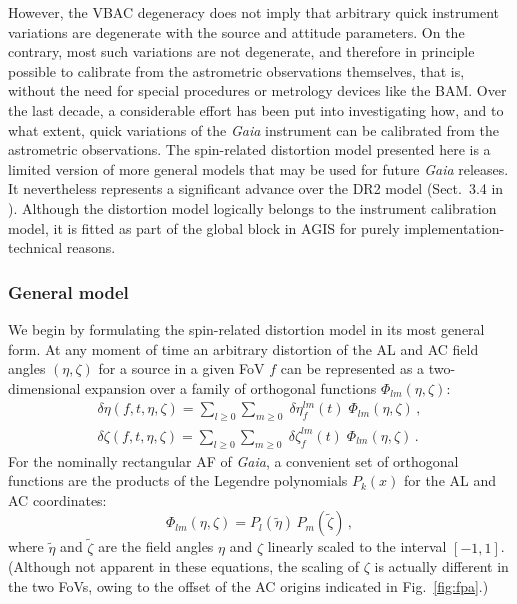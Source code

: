 \documentclass[longauth]{aa} %
\begin{document}
However, the VBAC degeneracy does not imply that arbitrary quick instrument variations
are degenerate with the source and attitude parameters. On the contrary, most such variations 
are not degenerate, and therefore in principle possible to calibrate from the astrometric 
observations themselves, that is, without the need for special procedures or metrology 
devices like the BAM. Over the last decade, 
a considerable effort has been put into investigating how, and to what extent, quick 
variations of the \textit{Gaia} instrument can be calibrated from the astrometric observations.
The spin-related distortion model presented here is a limited version of more general 
models that may be used for future \textit{Gaia} releases. It nevertheless represents 
a significant advance over the DR2 model (Sect.~3.4 in ).
Although the distortion model logically belongs to the instrument calibration model,
it is fitted as part of the global block in AGIS for purely implementation-technical reasons. 

\subsubsection{General model}
\label{sec:vbacfoc}

We begin by formulating the spin-related distortion model in its most general form.
At any moment of time an arbitrary distortion of the AL and AC
field angles $(\eta,\zeta)$ for a source in a given FoV $f$
can be represented as a two-dimensional expansion over a family of
orthogonal functions $\Phi_{lm}(\eta,\zeta)$:
%
\begin{eqnarray}\label{expansion-general-eta}
\delta\eta(f,t,\eta,\zeta)
=\sum\limits_{l\ge0}\sum\limits_{m\ge0}\;\delta\eta_f^{lm}(t)\;\Phi_{lm}(\eta,\zeta)\,,\\
\label{expansion-general-zeta}
\delta\zeta(f,t,\eta,\zeta)
=\sum\limits_{l\ge0}\sum\limits_{m\ge0}\;\delta\zeta_f^{lm}(t)\;\Phi_{lm}(\eta,\zeta)\,.
\end{eqnarray}
%
\noindent
For the nominally rectangular AF of \textit{Gaia}, a convenient set of orthogonal 
functions are the products of the Legendre polynomials $P_k(x)$ for the AL and AC coordinates: 
%
\begin{equation}\label{Phi-lm-Gaia}
\Phi_{lm}(\eta,\zeta)=P_l(\tilde\eta)\,P_m(\tilde\zeta)\,,
\end{equation}
%
where $\tilde\eta$ and $\tilde\zeta$ are the field angles $\eta$
and $\zeta$ linearly scaled to the interval $[-1,1]$. 
(Although not apparent in these equations, the scaling of $\zeta$ is actually different in the
two FoVs, owing to the offset of the AC origins indicated in Fig.~\ref{fig:fpa}.)
\end{document}
